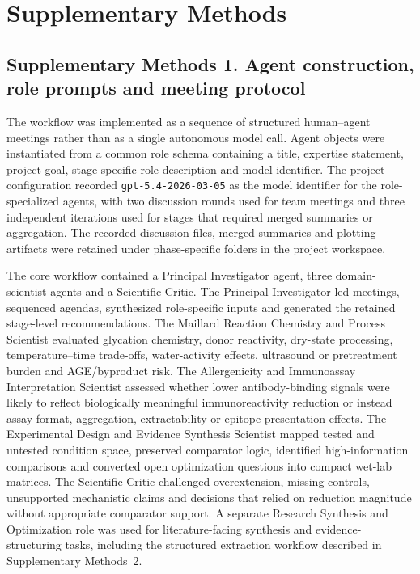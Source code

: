 ﻿%

\section*{Supplementary Methods}

\subsection*{Supplementary Methods 1. Agent construction, role prompts and meeting protocol}

The workflow was implemented as a sequence of structured human--agent meetings
rather than as a single autonomous model call. Agent objects were instantiated
from a common role schema containing a title, expertise statement, project goal,
stage-specific role description and model identifier. The project configuration
recorded \texttt{gpt-5.4-2026-03-05} as the model identifier for the
role-specialized agents, with two discussion rounds used for team meetings and
three independent iterations used for stages that required merged summaries or
aggregation. The recorded discussion files, merged summaries and plotting
artifacts were retained under phase-specific folders in the project workspace.

The core workflow contained a Principal Investigator agent, three domain-scientist
agents and a Scientific Critic. The Principal Investigator led meetings,
sequenced agendas, synthesized role-specific inputs and generated the retained
stage-level recommendations. The Maillard Reaction Chemistry and Process
Scientist evaluated glycation chemistry, donor reactivity, dry-state processing,
temperature--time trade-offs, water-activity effects, ultrasound or pretreatment
burden and AGE/byproduct risk. The Allergenicity and Immunoassay Interpretation
Scientist assessed whether lower antibody-binding signals were likely to reflect
biologically meaningful immunoreactivity reduction or instead assay-format,
aggregation, extractability or epitope-presentation effects. The Experimental
Design and Evidence Synthesis Scientist mapped tested and untested condition
space, preserved comparator logic, identified high-information comparisons and
converted open optimization questions into compact wet-lab matrices. The
Scientific Critic challenged overextension, missing controls, unsupported
mechanistic claims and decisions that relied on reduction magnitude without
appropriate comparator support. A separate Research Synthesis and Optimization
role was used for literature-facing synthesis and evidence-structuring tasks,
including the structured extraction workflow described in Supplementary
Methods~2.


